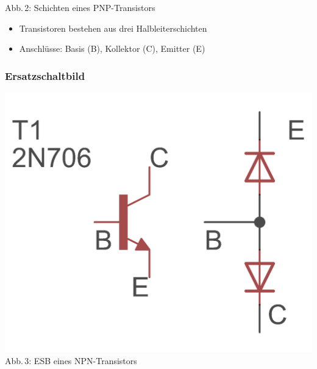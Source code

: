 \begin{frame}
\begin{minipage}{0.4\textwidth}
    {\tiny Abb.\,2: Schichten eines PNP-Transistors}
  \end{minipage}
  \vspace{0.5cm}
  \begin{center}
    \begin{itemize}
      \item Transistoren bestehen aus drei Halbleiterschichten
      \item Anschlüsse: Basis (B), Kollektor (C), Emitter (E)
    \end{itemize}
  \end{center}
\end{frame}

\begin{frame}
  \frametitle{Ersatzschaltbild}
  \begin{minipage}{0.4\textwidth}
    \includegraphics[width=\textwidth,height=.5\textheight,keepaspectratio]{a06/NPN_esb.png}\\
    {\tiny Abb.\,3: ESB eines NPN-Transistors}
  \end{minipage}
  \hspace{0.5cm}
  \begin{minipage}{0.4\textwidth}

\end{minipage}
\end{frame}
